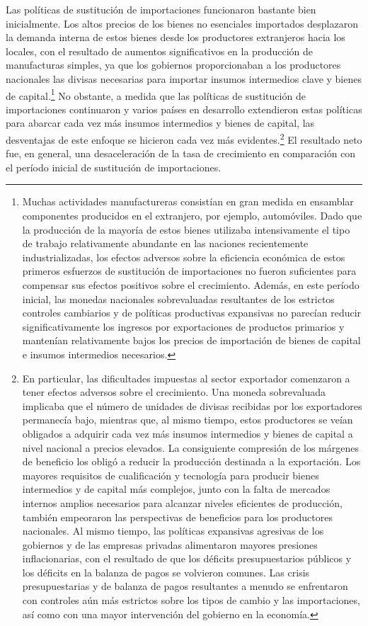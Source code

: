 \documentclass[10pt,a4paper]{article}
\begin{document}
Las políticas de sustitución de importaciones funcionaron bastante bien inicialmente. Los altos precios de los bienes no esenciales importados desplazaron la demanda interna de estos bienes desde los productores extranjeros hacia los locales, con el resultado de aumentos significativos en la producción de manufacturas simples, ya que los gobiernos proporcionaban a los productores nacionales las divisas necesarias para importar insumos intermedios clave y bienes de capital.\footnote{%
    Muchas actividades manufactureras consistían en gran medida en ensamblar componentes producidos en el extranjero, por ejemplo, automóviles. Dado que la producción de la mayoría de estos bienes utilizaba intensivamente el tipo de trabajo relativamente abundante en las naciones recientemente industrializadas, los efectos adversos sobre la eficiencia económica de estos primeros esfuerzos de sustitución de importaciones no fueron suficientes para compensar sus efectos positivos sobre el crecimiento. Además, en este período inicial, las monedas nacionales sobrevaluadas resultantes de los estrictos controles cambiarios y de políticas productivas expansivas no parecían reducir significativamente los ingresos por exportaciones de productos primarios y mantenían relativamente bajos los precios de importación de bienes de capital e insumos intermedios necesarios.
} No obstante, a medida que las políticas de sustitución de importaciones continuaron y varios países en desarrollo extendieron estas políticas para abarcar cada vez más insumos intermedios y bienes de capital, las desventajas de este enfoque se hicieron cada vez más evidentes.\footnote{%
    En particular, las dificultades impuestas al sector exportador comenzaron a tener efectos adversos sobre el crecimiento. Una moneda sobrevaluada implicaba que el número de unidades de divisas recibidas por los exportadores permanecía bajo, mientras que, al mismo tiempo, estos productores se veían obligados a adquirir cada vez más insumos intermedios y bienes de capital a nivel nacional a precios elevados. La consiguiente compresión de los márgenes de beneficio los obligó a reducir la producción destinada a la exportación. Los mayores requisitos de cualificación y tecnología para producir bienes intermedios y de capital más complejos, junto con la falta de mercados internos amplios necesarios para alcanzar niveles eficientes de producción, también empeoraron las perspectivas de beneficios para los productores nacionales. Al mismo tiempo, las políticas expansivas agresivas de los gobiernos y de las empresas privadas alimentaron mayores presiones inflacionarias, con el resultado de que los déficits presupuestarios públicos y los déficits en la balanza de pagos se volvieron comunes. Las crisis presupuestarias y de balanza de pagos resultantes a menudo se enfrentaron con controles aún más estrictos sobre los tipos de cambio y las importaciones, así como con una mayor intervención del gobierno en la economía.
} El resultado neto fue, en general, una desaceleración de la tasa de crecimiento en comparación con el período inicial de sustitución de importaciones.
\end{document}
